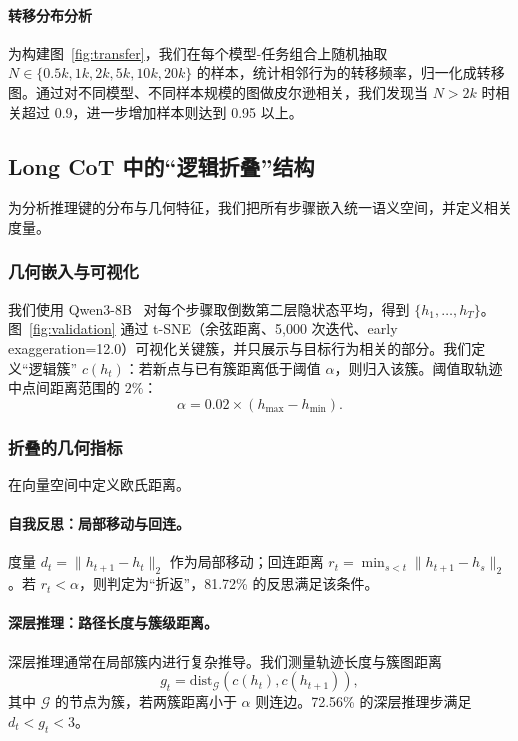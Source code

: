 \paragraph{\textbf{转移分布分析}}
\label{app:stable-bond-stability}
为构建图~\ref{fig:transfer}，我们在每个模型-任务组合上随机抽取 $N\in\{0.5k,1k,2k,5k,10k,20k\}$ 的样本，统计相邻行为的转移频率，归一化成转移图。通过对不同模型、不同样本规模的图做皮尔逊相关，我们发现当 $N>2k$ 时相关超过 0.9，进一步增加样本则达到 0.95 以上。

\subsection{Long CoT 中的“逻辑折叠”结构}
\label{app:folding}
为分析推理键的分布与几何特征，我们把所有步骤嵌入统一语义空间，并定义相关度量。

\subsubsection{几何嵌入与可视化}
我们使用 Qwen3-8B~\citep{yang2025qwen3} 对每个步骤取倒数第二层隐状态平均，得到 $\{h_1,\dots,h_T\}$。图~\ref{fig:validation} 通过 t-SNE（余弦距离、5,000 次迭代、early exaggeration=12.0）可视化关键簇，并只展示与目标行为相关的部分。我们定义“逻辑簇” $c(h_t)$：若新点与已有簇距离低于阈值 $\alpha$，则归入该簇。阈值取轨迹中点间距离范围的 $2\%$：
\begin{equation}
\alpha = 0.02 \times (h_{\max}-h_{\min}).
\end{equation}

\subsubsection{折叠的几何指标}
\label{app:folding-metrics}
在向量空间中定义欧氏距离。

\paragraph{自我反思：局部移动与回连。}
度量 $d_t = \lVert h_{t+1}-h_t \rVert_2$ 作为局部移动；回连距离 $r_t = \min_{s<t} \lVert h_{t+1}-h_s \rVert_2$。若 $r_t<\alpha$，则判定为“折返”，81.72\% 的反思满足该条件。\vspace{-5pt}

\paragraph{深层推理：路径长度与簇级距离。}
深层推理通常在局部簇内进行复杂推导。我们测量轨迹长度与簇图距离
\begin{equation}
  g_t = \mathrm{dist}_{\mathcal{G}} (c(h_t), c(h_{t+1})),
\end{equation}
其中 $\mathcal{G}$ 的节点为簇，若两簇距离小于 $\alpha$ 则连边。72.56\% 的深层推理步满足 $d_t<g_t<3$。\vspace{-5pt}

